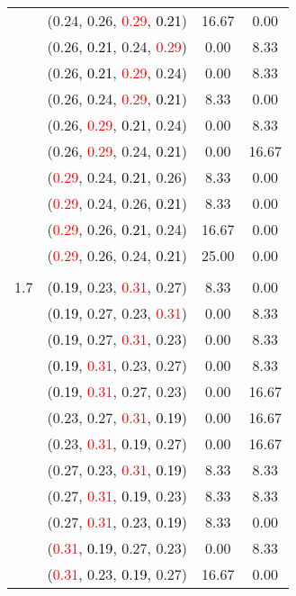 \documentclass[10pt,a4paper]{report}
\begin{document}
\begin{center}
\begin{longtable}{clcc}
			&(0.24, 0.26, \textcolor{red}{0.29}, \textcolor{black}{0.21})&16.67&0.00\\
			&(0.26, \textcolor{black}{0.21}, 0.24, \textcolor{red}{0.29})&0.00&8.33\\
			&(0.26, \textcolor{black}{0.21}, \textcolor{red}{0.29}, 0.24)&0.00&8.33\\
			&(0.26, 0.24, \textcolor{red}{0.29}, \textcolor{black}{0.21})&8.33&0.00\\
			&(0.26, \textcolor{red}{0.29}, \textcolor{black}{0.21}, 0.24)&0.00&8.33\\
			&(0.26, \textcolor{red}{0.29}, 0.24, \textcolor{black}{0.21})&0.00&16.67\\
			&(\textcolor{red}{0.29}, 0.24, \textcolor{black}{0.21}, 0.26)&8.33&0.00\\
			&(\textcolor{red}{0.29}, 0.24, 0.26, \textcolor{black}{0.21})&8.33&0.00\\
			&(\textcolor{red}{0.29}, 0.26, \textcolor{black}{0.21}, 0.24)&16.67&0.00\\
			&(\textcolor{red}{0.29}, 0.26, 0.24, \textcolor{black}{0.21})&25.00&0.00\\
		&&&\\
		1.7			&(\textcolor{black}{0.19}, 0.23, \textcolor{red}{0.31}, 0.27)&8.33&0.00\\
			&(\textcolor{black}{0.19}, 0.27, 0.23, \textcolor{red}{0.31})&0.00&8.33\\
			&(\textcolor{black}{0.19}, 0.27, \textcolor{red}{0.31}, 0.23)&0.00&8.33\\
			&(\textcolor{black}{0.19}, \textcolor{red}{0.31}, 0.23, 0.27)&0.00&8.33\\
			&(\textcolor{black}{0.19}, \textcolor{red}{0.31}, 0.27, 0.23)&0.00&16.67\\
			&(0.23, 0.27, \textcolor{red}{0.31}, \textcolor{black}{0.19})&0.00&16.67\\
			&(0.23, \textcolor{red}{0.31}, \textcolor{black}{0.19}, 0.27)&0.00&16.67\\
			&(0.27, 0.23, \textcolor{red}{0.31}, \textcolor{black}{0.19})&8.33&8.33\\
			&(0.27, \textcolor{red}{0.31}, \textcolor{black}{0.19}, 0.23)&8.33&8.33\\
			&(0.27, \textcolor{red}{0.31}, 0.23, \textcolor{black}{0.19})&8.33&0.00\\
			&(\textcolor{red}{0.31}, \textcolor{black}{0.19}, 0.27, 0.23)&0.00&8.33\\
			&(\textcolor{red}{0.31}, 0.23, \textcolor{black}{0.19}, 0.27)&16.67&0.00\\

\end{longtable}
\end{center}
\end{document}
